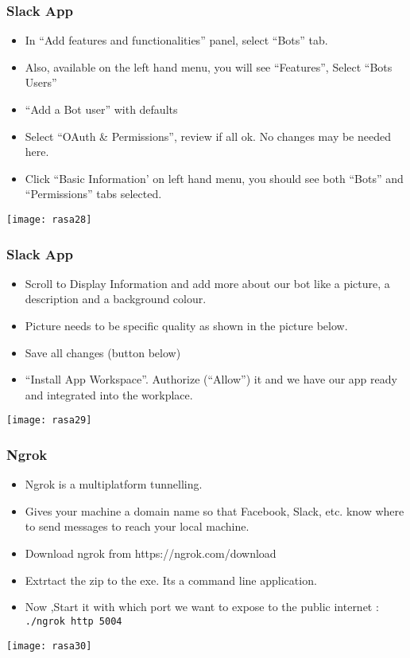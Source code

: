 \begin{frame}[fragile]\frametitle{Slack App}
\begin{itemize}
\item In ``Add features and functionalities'' panel, select ``Bots'' tab.
\item Also, available on the left hand menu, you will see ``Features'', Select ``Bots Users''
\item ``Add a Bot user'' with defaults
\item Select ``OAuth \& Permissions'', review if all ok. No changes may be needed here.
\item Click ``Basic Information' on left hand menu, you should see both ``Bots'' and ``Permissions'' tabs selected.
\end{itemize}

\begin{center}
\texttt{[image: rasa28]}
\end{center}
\end{frame}

\begin{frame}[fragile]\frametitle{Slack App}
\begin{itemize}
\item Scroll to Display Information and add more about our bot like a picture, a description and a background colour.
\item Picture needs to be specific quality as shown in the picture below.
\item Save all changes (button below)
\item ``Install App Workspace''. Authorize (``Allow'') it and we have our app ready and integrated into the workplace.
\end{itemize}

\begin{center}
\texttt{[image: rasa29]}
\end{center}
\end{frame}

\begin{frame}[fragile]\frametitle{Ngrok}
\begin{itemize}
\item Ngrok is a multiplatform tunnelling.
\item Gives your machine a domain name so that Facebook, Slack, etc. know where to send messages to reach your local machine.
\item Download ngrok from https://ngrok.com/download 	
\item Extrtact the zip to the exe. Its a command line application.
\item Now ,Start it with which port we want to expose to the public internet : \lstinline| ./ngrok http 5004|
\end{itemize}

\begin{center}
\texttt{[image: rasa30]}
\end{center}
\end{frame}

